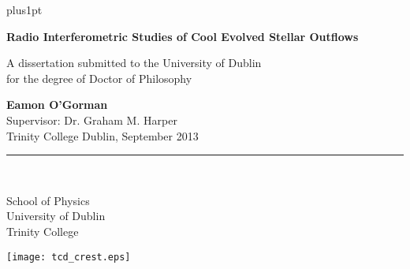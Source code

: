 \documentclass[a4paper, oneside,12pt]{Latex/Classes/PhDthesisPSnPDF}
\begin{document}
\renewcommand\baselinestretch{1.2}
\baselineskip=18pt plus1pt


\newcommand{\titlefont}{\bfseries \fontsize{22}{26.42pt}\selectfont}
\newcommand{\largetitlefont}{\bfseries \fontsize{29.88}{35.88pt}\selectfont}
\newcommand{\othertitlefont}{\fontsize{14.4}{17.28}\selectfont}
\newcommand{\authorfont}{\bfseries \fontsize{14.4}{17.28}\selectfont}
\newcommand{\informationfont}{\fontsize{10}{12}\selectfont}
\newcommand{\dedicationfont}{\slshape \fontsize{14.4}{17.28}\selectfont}

\newcommand{\thisyear}{\number\year}
\def\thismonth{\ifcase\month\or January\or February\or March\or
  April\or May\or June\or July\or August\or September\or October\or November\or December\fi}
\newcommand{\todaysdate}{\thismonth\space \thisyear}

\renewcommand{\baselinestretch}{1}
\newpage \thispagestyle{empty}
\vspace*{1.5cm}
\begin{flushright}



\Huge{\textbf{Radio Interferometric Studies of Cool Evolved Stellar Outflows}}

\end{flushright}

\vspace*{4cm}
\begin{flushright}
A dissertation submitted to the University of Dublin \\
for the degree of Doctor of Philosophy
\end{flushright}

\vspace*{\fill}
\begin{flushright}
{\authorfont Eamon O'Gorman} \\[1mm]
Supervisor: Dr. Graham M. Harper\\[.5mm]
Trinity College Dublin, September 2013\\[.5mm]
\rule{0.9\textwidth}{0.5mm}\\[4mm]

\begin{minipage}[b][15mm][t]{12.5cm}
\raggedleft \sc
School of Physics\\
University of Dublin\\
Trinity College\\
\end{minipage}
\hspace*{1mm}
\begin{minipage}[b][15mm][t]{1.15cm}
\texttt{[image: tcd\_crest.eps]}
\end{minipage}

 \end{flushright}
\end{document}
